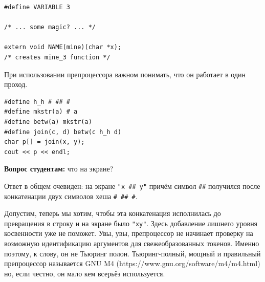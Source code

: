 \documentclass[a4paper,12pt,oneside]{article}
\newif\ifanswers
\begin{document}
\begin{lstlisting}
#define VARIABLE 3

/* ... some magic? ... */

extern void NAME(mine)(char *x);
/* creates mine_3 function */
\end{lstlisting}

\ifanswers
Правильный ответ должен включать не менее трёх уровней косвенности:

\begin{lstlisting}
#define PASTER(x,y) x ## _ ## y
#define EVALUATOR(x,y)  PASTER(x,y)
#define NAME(fun) EVALUATOR(fun, VARIABLE)
\end{lstlisting}

Порядок расширения макросов следующий:

\begin{lstlisting}
NAME(mine)
EVALUATOR(mine, VARIABLE)
PASTER(mine, 3)
\end{lstlisting}

Поэтому пропустить хотя бы один уровень косвенности здесь нельзя.
\fi

При использовании препроцессора важном понимать, что он работает в один проход.

\begin{lstlisting}
#define h_h # ## #
#define mkstr(a) # a
#define betw(a) mkstr(a)
#define join(c, d) betw(c h_h d)
char p[] = join(x, y);
cout << p << endl;
\end{lstlisting}

\textbf{Вопрос студентам:} что на экране?

\ifanswers
Порядок расширения следующий:

\begin{lstlisting}
join(x, y)
betw(x # ## # y)
mkstr(x ## y)
"x ## y"
\end{lstlisting}
\fi

Ответ в общем очевиден: на экране \lstinline!"x ## y"! причём символ \lstinline!##! получился после конкатенации двух символов хеша \lstinline!# ## #!.

Допустим, теперь мы хотим, чтобы эта конкатенация исполнилась до превращения в строку и на экране было \lstinline!"xy"!. Здесь добавление лишнего уровня косвенности уже не поможет. Увы, увы, препроцессор не начинает проверку на возможную идентификацию аргументов для свежеобразованных токенов. Именно поэтому, к слову, он не Тьюринг полон. Тьюринг-полный, мощный и правильный препроцессор называется GNU M4 (https://www.gnu.org/software/m4/m4.html) но, если честно, он мало кем всерьёз используется.
\end{document}
